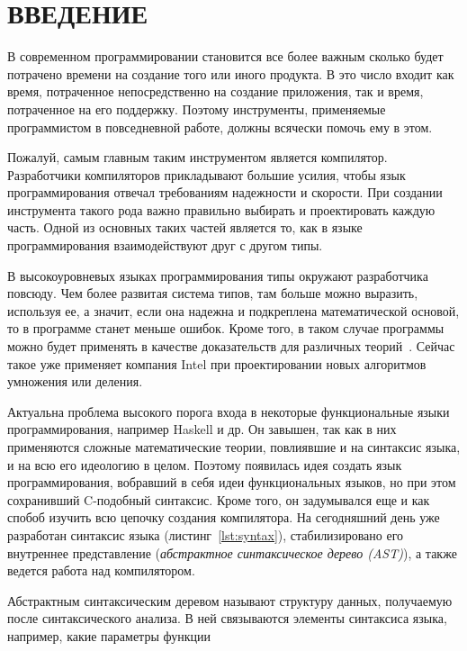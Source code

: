 \chapter*{ВВЕДЕНИЕ}\label{ch:introduction}


В современном программировании становится все более важным сколько будет потрачено времени на создание того или иного продукта.
В это число входит как время, потраченное непосредственно на создание приложения, так и время, потраченное на его поддержку.
Поэтому инструменты, применяемые программистом в повседневной работе, должны всячески помочь ему в этом.

Пожалуй, самым главным таким инструментом является компилятор.
Разработчики компиляторов прикладывают большие усилия, чтобы язык программирования отвечал требованиям надежности и скорости.
При создании инструмента такого рода важно правильно выбирать и проектировать каждую часть.
Одной из основных таких частей является то, как в языке программирования взаимодействуют друг с другом типы.

В высокоуровневых языках программирования типы окружают разработчика повсюду.
Чем более развитая система типов, там больше можно выразить, используя ее, а значит, если она надежна и подкреплена математической основой, то в программе станет меньше ошибок.
Кроме того, в таком случае программы можно будет применять в качестве доказательств для различных теорий~\cite{AutoProvement}.
Сейчас такое уже применяет компания Intel при проектировании новых алгоритмов умножения или деления.

Актуальна проблема высокого порога входа в некоторые функциональные языки программирования, например Haskell и др.
Он завышен, так как в них применяются сложные математические теории, повлиявшие и на синтаксис языка, и на всю его идеологию в целом.
Поэтому появилась идея создать язык программирования, вобравший в себя идеи функциональных языков, но при этом сохранивший C-подобный синтаксис.
Кроме того, он задумывался еще и как спобоб изучить всю цепочку создания компилятора.
На сегодняшний день уже разработан синтаксис языка (листинг~\ref{lst:syntax}), стабилизировано его внутреннее представление (\textit{абстрактное синтаксическое дерево (AST)}), а также ведется работа над компилятором.

Абстрактным синтаксическим деревом называют структуру данных, получаемую после синтаксического анализа.
В ней связываются элементы синтаксиса языка, например, какие параметры функции

